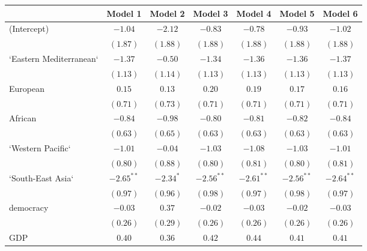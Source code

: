 
\begin{table}[!h]
\begin{center}
\begin{tabular}{l c c c c c c }
\toprule
 & Model 1 & Model 2 & Model 3 & Model 4 & Model 5 & Model 6 \\
\midrule
(Intercept)             & $-1.04$      & $-2.12$      & $-0.83$      & $-0.78$      & $-0.93$      & $-1.02$      \\
                        & $(1.87)$     & $(1.88)$     & $(1.88)$     & $(1.88)$     & $(1.88)$     & $(1.88)$     \\
`Eastern Mediterranean` & $-1.37$      & $-0.50$      & $-1.34$      & $-1.36$      & $-1.36$      & $-1.37$      \\
                        & $(1.13)$     & $(1.14)$     & $(1.13)$     & $(1.13)$     & $(1.13)$     & $(1.13)$     \\
European                & $0.15$       & $0.13$       & $0.20$       & $0.19$       & $0.17$       & $0.16$       \\
                        & $(0.71)$     & $(0.73)$     & $(0.71)$     & $(0.71)$     & $(0.71)$     & $(0.71)$     \\
African                 & $-0.84$      & $-0.98$      & $-0.80$      & $-0.81$      & $-0.82$      & $-0.84$      \\
                        & $(0.63)$     & $(0.65)$     & $(0.63)$     & $(0.63)$     & $(0.63)$     & $(0.63)$     \\
`Western Pacific`       & $-1.01$      & $-0.04$      & $-1.03$      & $-1.08$      & $-1.03$      & $-1.01$      \\
                        & $(0.80)$     & $(0.88)$     & $(0.80)$     & $(0.81)$     & $(0.80)$     & $(0.81)$     \\
`South-East Asia`       & $-2.65^{**}$ & $-2.34^{*}$  & $-2.56^{**}$ & $-2.61^{**}$ & $-2.56^{**}$ & $-2.64^{**}$ \\
                        & $(0.97)$     & $(0.96)$     & $(0.98)$     & $(0.97)$     & $(0.98)$     & $(0.97)$     \\
democracy               & $-0.03$      & $0.37$       & $-0.02$      & $-0.03$      & $-0.02$      & $-0.03$      \\
                        & $(0.26)$     & $(0.29)$     & $(0.26)$     & $(0.26)$     & $(0.26)$     & $(0.26)$     \\
GDP                     & $0.40$       & $0.36$       & $0.42$       & $0.44$       & $0.41$       & $0.41$       \\

\end{tabular}
\end{center}
\end{table}
